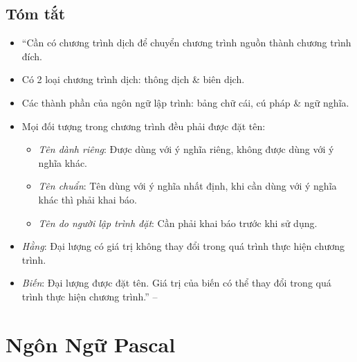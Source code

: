 \documentclass[oneside]{book}
\numberwithin{equation}{section}
\begin{document}
\subsection{Tóm tắt}
\begin{itemize}
	\item ``Cần có chương trình dịch để chuyển chương trình nguồn thành chương trình đích.
	\item Có 2 loại chương trình dịch: thông dịch \& biên dịch.
	\item Các thành phần của ngôn ngữ lập trình: bảng chữ cái, cú pháp \& ngữ nghĩa.
	\item Mọi đối tượng trong chương trình đều phải được đặt tên:
	\begin{itemize}
		\item \textit{Tên dành riêng}: Được dùng với ý nghĩa riêng, không được dùng với ý nghĩa khác.
		\item \textit{Tên chuẩn}: Tên dùng với ý nghĩa nhất định, khi cần dùng với ý nghĩa khác thì phải khai báo.
		\item \textit{Tên do người lập trình đặt}: Cần phải khai báo trước khi sử dụng.
	\end{itemize}
	\item \textit{Hằng}: Đại lượng có giá trị không thay đổi trong quá trình thực hiện chương trình.
	\item \textit{Biến}: Đại lượng được đặt tên. Giá trị của biến có thể thay đổi trong quá trình thực hiện chương trình.'' -- \cite[p. 13]{SGK_Tin_Hoc_11}
\end{itemize}

\section{Ngôn Ngữ Pascal}
\end{document}
